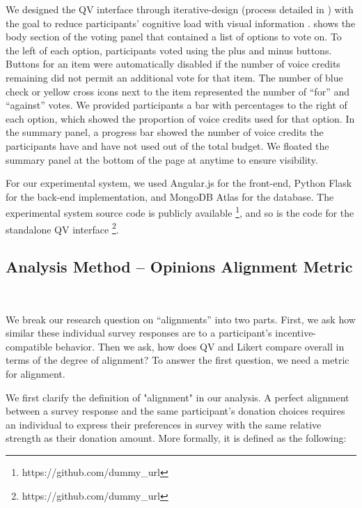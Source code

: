We designed the QV interface through iterative-design (process detailed in ) with the goal to reduce participants' cognitive load with visual information \cite{oviatt2006human}.  shows the body section of the voting panel that contained a list of options to vote on. To the left of each option, participants voted using the plus and minus buttons. Buttons for an item were automatically disabled if the number of voice credits remaining did not permit an additional vote for that item. The number of blue check or yellow cross icons next to the item represented the number of ``for'' and ``against'' votes. We provided participants a bar with percentages to the right of each option, which showed the proportion of voice credits used for that option.  In the summary panel, a progress bar showed the number of voice credits the participants have and have not used out of the total budget. We floated the summary panel at the bottom of the page at anytime to ensure visibility.

For our experimental system, we used Angular.js for the front-end, Python Flask for the back-end implementation, and MongoDB Atlas for the database. The experimental system source code is publicly available \footnote{https://github.com/dummy\_url}, and so is the code for the standalone QV interface \footnote{https://github.com/dummy\_url}. 



\subsection{Analysis Method -- Opinions Alignment Metric}~\label{alignment_metric}

We break our research question on ``alignments'' into two parts. First, we ask how similar these individual survey responses are to a participant's incentive-compatible behavior. Then we ask, how does QV and Likert compare overall in terms of the degree of alignment? To answer the first question, we need a metric for alignment.

We first clarify the definition of "alignment" in our analysis. A perfect alignment between a survey response and the same participant's donation choices requires an individual to express their preferences in survey with the same relative strength as their donation amount. More formally, it is defined as the following:

